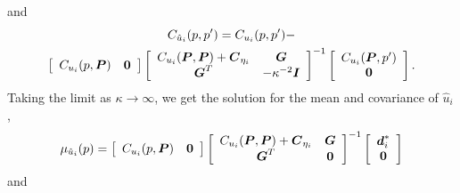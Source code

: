 \documentclass[extra,mreferee]{gji}
\begin{document}
and
\begin{multline}\label{eq:PosteriorCov2}
C_{\hat{u}_i}(p,p') = C_{u_i}(p,p') - \\ 
                      \left[\begin{array}{cc}
                          C_{u_i}(p,\mitbf{P}) & \mitbf{0} \\
                          \end{array}\right]
                      \left[\begin{array}{cc}
                          C_{u_i}(\mitbf{P},\mitbf{P}) + \mitbf{C}_{\eta_i} & \mitbf{G} \\
                          \mitbf{G}^T  & -\kappa^{-2} \mitbf{I} \\
                          \end{array}\right]^{-1}
                      \left[\begin{array}{c}
                          C_{u_i}(\mitbf{P},p') \\
                          \mitbf{0} \\
                          \end{array}\right].
\end{multline}
Taking the limit as $\kappa \to \infty$, we get the solution for the mean and covariance of $\hat{u}_i$,
 \begin{equation}\label{eq:PosteriorMean3}
\mu_{\hat{u}_i}(p) = \left[\begin{array}{cc}
                         C_{u_i}(p,\mitbf{P}) & \mitbf{0} \\
                         \end{array}\right]
                     \left[\begin{array}{cc}
                         C_{u_i}(\mitbf{P},\mitbf{P}) + \mitbf{C}_{\eta_i} & \mitbf{G} \\
                         \mitbf{G}^T  & \mitbf{0} \\
                         \end{array}\right]^{-1}
                     \left[\begin{array}{c}
                         \mitbf{d}^*_i \\
                         \mitbf{0} \\
                         \end{array}\right]
\end{equation}    
and
\end{document}
